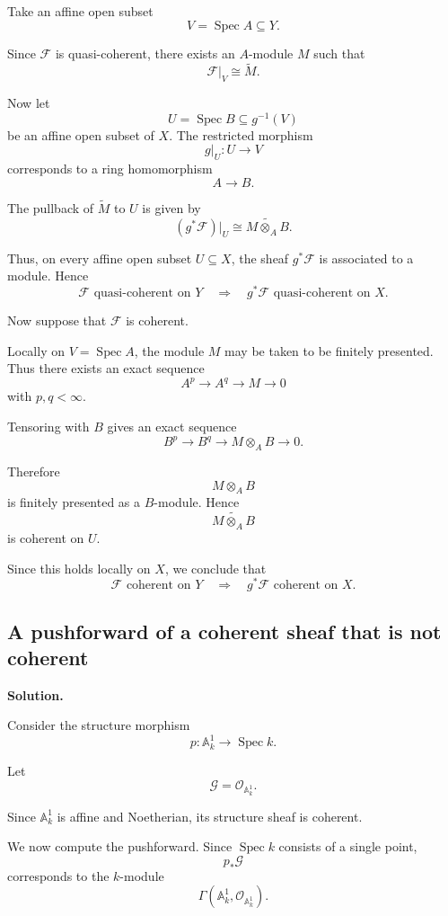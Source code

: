 \documentclass[12pt,a4paper]{article}
\DeclareMathOperator{\Spec}{Spec}
\newcommand{\OO}{\mathcal{O}}
\providecommand{\Spec}{\operatorname{Spec}}
\providecommand{\A}{\mathbb A}
\theoremstyle{notespace}
\begin{document}
Take an affine open subset
\[
V=\Spec A\subseteq Y.
\]

Since \(\mathcal{F}\) is quasi-coherent, there exists an \(A\)-module \(M\) such that
\[
\mathcal{F}|_V\cong \widetilde{M}.
\]

Now let
\[
U=\Spec B\subseteq g^{-1}(V)
\]
be an affine open subset of \(X\). The restricted morphism
\[
g|_U:U\longrightarrow V
\]
corresponds to a ring homomorphism
\[
A\longrightarrow B.
\]

The pullback of \(\widetilde{M}\) to \(U\) is given by
\[
(g^*\mathcal{F})|_U
\cong
\widetilde{M\otimes_A B}.
\]

Thus, on every affine open subset \(U\subseteq X\), the sheaf \(g^*\mathcal{F}\) is associated to a module. Hence
\[
\boxed{
	\mathcal{F}\text{ quasi-coherent on }Y
	\quad\Longrightarrow\quad
	g^*\mathcal{F}\text{ quasi-coherent on }X.
}
\]

Now suppose that \(\mathcal{F}\) is coherent.

Locally on \(V=\Spec A\), the module \(M\) may be taken to be finitely presented. Thus there exists an exact sequence
\[
A^p\longrightarrow A^q\longrightarrow M\longrightarrow 0
\]
with \(p,q<\infty\).

Tensoring with \(B\) gives an exact sequence
\[
B^p\longrightarrow B^q\longrightarrow M\otimes_A B\longrightarrow 0.
\]

Therefore
\[
M\otimes_A B
\]
is finitely presented as a \(B\)-module. Hence
\[
\widetilde{M\otimes_A B}
\]
is coherent on \(U\).

Since this holds locally on \(X\), we conclude that
\[
\boxed{
	\mathcal{F}\text{ coherent on }Y
	\quad\Longrightarrow\quad
	g^*\mathcal{F}\text{ coherent on }X.
}
\]

\subsection{A pushforward of a coherent sheaf that is not coherent}

\textbf{Solution.}

Consider the structure morphism
\[
p:\A^1_k\longrightarrow \Spec k.
\]

Let
\[
\mathcal{G}=\OO_{\A^1_k}.
\]

Since \(\A^1_k\) is affine and Noetherian, its structure sheaf is coherent.

We now compute the pushforward. Since \(\Spec k\) consists of a single point,
\[
p_*\mathcal{G}
\]
corresponds to the \(k\)-module
\[
\Gamma(\A^1_k,\OO_{\A^1_k}).
\]
\end{document}

